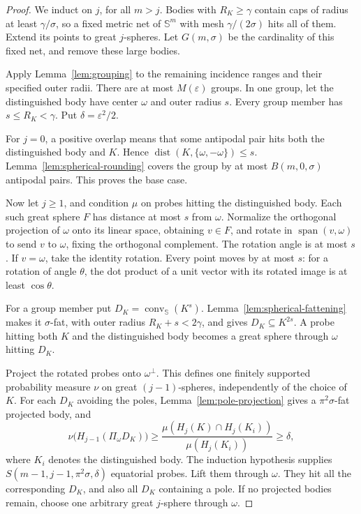 \documentclass[11pt]{article}
\theoremstyle{remark}
\newcommand{\Sph}{\mathbb S}
\newcommand{\eps}{\varepsilon}
\newcommand{\dist}{\operatorname{dist}}
\newcommand{\conv}{\operatorname{conv}}
\newcommand{\Span}{\operatorname{span}}
\begin{document}
\begin{proof}
We induct on \(j\), for all \(m>j\).
Bodies with \(R_K\geq\gamma\) contain caps of radius at least
\(\gamma/\sigma\), so a fixed metric net of \(\Sph^m\) with mesh
\(\gamma/(2\sigma)\) hits all of them.
Extend its points to great \(j\)-spheres.
Let \(G(m,\sigma)\) be the cardinality of this fixed net, and remove
these large bodies.

Apply Lemma~\ref{lem:grouping} to the remaining incidence ranges and
their specified outer radii. There are at most \(M(\eps)\) groups.
In one group, let the distinguished body have center \(\omega\) and
outer radius \(s\). Every group member has \(s\leq R_K<\gamma\).
Put \(\delta=\eps^2/2\).

For \(j=0\), a positive overlap means that some antipodal pair hits
both the distinguished body and \(K\). Hence
\(\dist(K,\{\omega,-\omega\})\leq s\).
Lemma~\ref{lem:spherical-rounding} covers the group by at most
\(B(m,0,\sigma)\) antipodal pairs. This proves the base case.

Now let \(j\geq1\), and condition \(\mu\) on probes hitting the
distinguished body.
Each such great sphere \(F\) has distance at most \(s\) from \(\omega\).
Normalize the orthogonal projection of \(\omega\) onto its linear space,
obtaining \(v\in F\), and rotate in \(\Span(v,\omega)\) to send \(v\)
to \(\omega\), fixing the orthogonal complement.
The rotation angle is at most \(s\).
If \(v=\omega\), take the identity rotation.
Every point moves by at most \(s\): for a rotation of angle \(\theta\),
the dot product of a unit vector with its rotated image is at least
\(\cos\theta\).

For a group member put \(D_K=\conv_{\Sph}(K^s)\).
Lemma~\ref{lem:spherical-fattening} makes it \(\sigma\)-fat, with
outer radius \(R_K+s<2\gamma\), and gives \(D_K\subseteq K^{2s}\).
A probe hitting both \(K\) and the distinguished body becomes a great
sphere through \(\omega\) hitting \(D_K\).

Project the rotated probes onto \(\omega^\perp\).
This defines one finitely supported probability measure \(\nu\) on
great \((j-1)\)-spheres, independently of the choice of \(K\).
For each \(D_K\) avoiding the poles, Lemma~\ref{lem:pole-projection}
gives a \(\pi^2\sigma\)-fat projected body, and
\[
 \nu\bigl(H_{j-1}(\Pi_\omega D_K)\bigr)
 \geq\frac{\mu(H_j(K)\cap H_j(K_i))}{\mu(H_j(K_i))}
 \geq\delta,
\]
where \(K_i\) denotes the distinguished body.
The induction hypothesis supplies
\(S(m-1,j-1,\pi^2\sigma,\delta)\) equatorial probes.
Lift them through \(\omega\). They hit all the corresponding
\(D_K\), and also all \(D_K\) containing a pole.
If no projected bodies remain, choose one arbitrary great
\(j\)-sphere through \(\omega\).


\end{proof}
\end{document}
